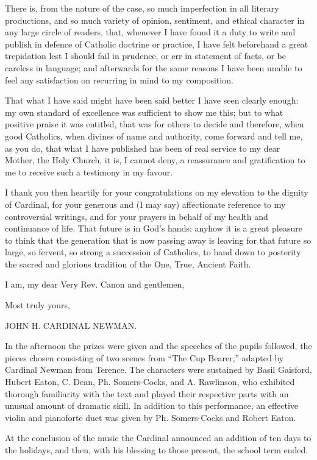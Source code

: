 There is, from the nature of the case, so much imperfection in all
literary productions, and so much variety of opinion, sentiment, and
ethical character in any large circle of readers, that, whenever I
have found it a duty to write and publish in defence of Catholic
doctrine or practice, I have felt beforehand a great trepidation lest I should fail in prudence, or err in statement of facts, or be
careless in language; and afterwards for the same reasons I have been
unable to feel any satisfaction on recurring in mind to my
composition.

That what I have said might have been said better I have seen
clearly enough: my own standard of excellence was sufficient to show
me this; but to what positive praise it was entitled, that was for
others to decide and therefore, when good Catholics, when divines of
name and authority, come forward and tell me, as you do, that what I
have published has been of real service to my dear Mother, the Holy
Church, it is, I cannot deny, a reassurance and gratification to me to
receive such a testimony in my favour.

I thank you then heartily for your congratulations on my elevation
to the dignity of Cardinal, for your generous and (I may say)
affectionate reference to my controversial writings, and for your
prayers in behalf of my health and continuance of life. That future is
in God's hands: anyhow it is a great pleasure to think that the
generation that is now passing away is leaving for that future so
large, so fervent, so strong a succession of Catholics, to hand
down to posterity the sacred and glorious tradition of the One, True,
Ancient Faith.

I am, my dear Very Rev. Canon and gentlemen,

Most truly yours,

JOHN H. CARDINAL NEWMAN.

In the afternoon the prizes were given and the speeches of the
pupils followed, the pieces chosen consisting of two scenes from
``The Cup Bearer,'' adapted by Cardinal Newman from Terence.
The characters were sustained by Basil Gaisford, Hubert Eaton, C.
Dean, Ph. Somers-Cocks, and A. Rawlinson, who exhibited thorough
familiarity with the text and played their respective parts with an
unusual amount of dramatic skill. In addition to this performance, an
effective violin and pianoforte duet was given by Ph. Somers-Cocks and
Robert Eaton.

At the conclusion of the music the Cardinal announced an addition
of ten days to the holidays, and then, with his blessing to those
present, the school term ended.

